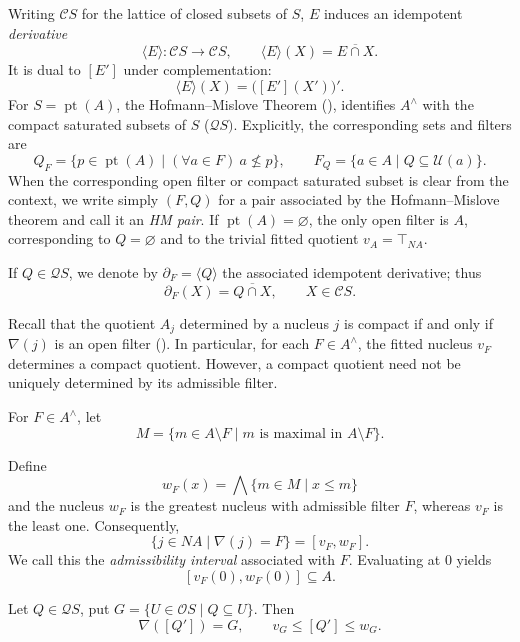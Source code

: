 \documentclass[11pt]{amsart}
\DeclareMathOperator{\pt}{pt}
\theoremstyle{plain}
\theoremstyle{definition}
\begin{document}
Writing $\mathcal{C}S$ for the lattice of closed subsets of $S$, 
$E$ induces an idempotent
\emph{derivative}
\[
\langle E\rangle\colon \mathcal{C}S\to\mathcal{C}S,
\qquad
\langle E\rangle(X)=\overline{E\cap X}.
\]
It is dual to $[E']$ under complementation:
\[
\langle E\rangle(X)=\bigl([E'](X')\bigr)'.
\]
For $S=\pt(A)$, the Hofmann--Mislove Theorem (\cite[Theorem 2.16]{hofmann2006local}), identifies $A^\wedge$ with the compact saturated subsets of $S$ ($\mathcal{Q}S)$. 
Explicitly, the corresponding sets and filters are
\[
Q_F=\{p\in\pt(A)\mid (\forall a\in F)\ a\nleq p\},
\qquad
F_Q=\{a\in A\mid Q\subseteq\mathcal U(a)\}.
\]
When the corresponding open filter or compact saturated subset
is clear from the context, we write simply $(F,Q)$ for a pair
associated by the Hofmann--Mislove theorem and call it an
\emph{HM pair}. If $\pt(A)=\varnothing$, the only open filter is $A$, 
corresponding to $Q=\varnothing$ and to the trivial fitted quotient $v_A=\top_{NA}$.

If $Q\in \mathcal{Q}S$, we denote by $\partial_F=\langle Q\rangle$
the associated idempotent derivative; thus
\[
\partial_F(X)=\overline{Q\cap X},
\qquad X\in\mathcal{C}S.
\]

Recall that the quotient $A_j$ determined by a nucleus $j$ is compact if and only if $\nabla(j)$ is an open filter (\cite[Lemma 4.4]{escardo2003joins}). In particular, for each $F\in A^\wedge$, the fitted nucleus $v_F$ determines a compact quotient. However, a compact quotient need not be uniquely determined by its admissible filter.

For $F\in A^\wedge$, let
\begin{equation}\label{ConjuntoM}
M=\{m\in A\setminus F\mid m\text{ is maximal in }A\setminus F\}.
\end{equation}

Define
\[
w_F(x)=\bigwedge\{m\in M\mid x\leq m\}
\]
and the nucleus $w_F$ is the greatest nucleus with admissible filter $F$, whereas $v_F$ is the least one. Consequently,
\[
\{j\in NA\mid\nabla(j)=F\}=[v_F,w_F].
\]
We call this the \emph{admissibility interval} associated with $F$. Evaluating at $0$ yields
\[
[v_F(0),w_F(0)]\subseteq A.
\]

Let $Q\in \mathcal{Q}S$, put
$G=\{U\in\mathcal OS\mid Q\subseteq U\}$.
Then
\[
\nabla([Q'])=G,
\qquad
v_G\leq[Q']\leq w_G.
\]
\end{document}

